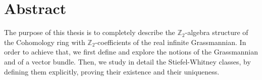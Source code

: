 \chapter*{Abstract}
The purpose of this thesis is to completely describe the $\mathbb{Z}_2$-algebra structure of the Cohomology ring with $\mathbb{Z}_2$-coefficients of the real infinite Grassmannian. In order to achieve that, we first define and explore the notions of the Grassmannian and of a vector bundle. Then, we study in detail the Stiefel-Whitney classes, by defining them explicitly, proving their existence and their uniqueness.
